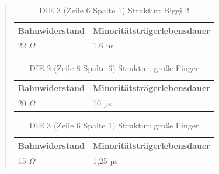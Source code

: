 \begin{quote}
     \vspace{2em}


      		\begin{table}[H]
     		  \begin{addmargin}[3cm]{3cm}
     			\centering
                   \begin{tabular}{|p{5cm}|p{5cm}|}
         			\hline
         			Bahnwiderstand &  Minoritätsträgerlebensdauer\\
         			\hline
        			22 $\Omega$ & 1.6 µs \\
        			\hline

                    \end{tabular}
              \end{addmargin}
              \caption{DIE 3 (Zeile 6 Spalte 1) Struktur: Biggi 2}
              \label{tab:bahnMinbigauss}
            \end{table}

     \vspace{2em}

      		\begin{table}[H]
     		  \begin{addmargin}[3cm]{3cm}
     			\centering
                   \begin{tabular}{|p{5cm}|p{5cm}|}
         			\hline
         			Bahnwiderstand &  Minoritätsträgerlebensdauer\\
         			\hline
        			20 $\Omega$ & 10 µs \\
        			\hline

                    \end{tabular}
              \end{addmargin}
              \caption{DIE 2 (Zeile 8 Spalte 6) Struktur: große Finger}
              \label{tab:bahnMinfingmitt}
            \end{table}

     \vspace{2em}

      		\begin{table}[H]
     		  \begin{addmargin}[3cm]{3cm}
     			\centering
                   \begin{tabular}{|p{5cm}|p{5cm}|}
         			\hline
         			Bahnwiderstand &  Minoritätsträgerlebensdauer\\
         			\hline
        			15  $\Omega$ & 1,25 µs \\
        			\hline

                    \end{tabular}
              \end{addmargin}
              \caption{DIE 3 (Zeile 6 Spalte 1) Struktur: große Finger}
              \label{tab:bahnMinfingaus}
            \end{table}


\end{quote}
